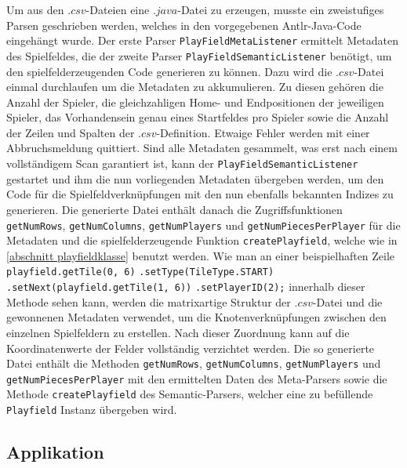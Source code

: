 \documentclass[conference]{IEEEtran}
\begin{document}
Um aus den $.csv$-Dateien eine $.java$-Datei zu erzeugen, musste ein zweistufiges Parsen geschrieben werden, welches in
den vorgegebenen Antlr-Java-Code eingeh\"angt wurde. Der erste Parser \texttt{PlayFieldMetaListener} ermittelt Metadaten des Spielfeldes, die der zweite Parser \texttt{PlayFieldSemanticListener} ben\"otigt, um den spielfelderzeugenden Code generieren zu k\"onnen. Dazu wird die $.csv$-Datei einmal durchlaufen um die Metadaten zu akkumulieren. Zu diesen geh\"oren die Anzahl der Spieler, die gleichzahligen Home- und Endpositionen der jeweiligen Spieler, das Vorhandensein genau eines Startfeldes pro Spieler sowie die Anzahl der Zeilen und Spalten der $.csv$-Definition. Etwaige Fehler werden mit einer Abbruchsmeldung quittiert. Sind alle Metadaten gesammelt, was erst nach einem vollst\"andigem Scan garantiert ist, kann der \texttt{PlayFieldSemanticListener} gestartet und ihm die nun vorliegenden Metadaten \"ubergeben werden, um den Code f\"ur die Spielfeldverkn\"upfungen mit den nun ebenfalls bekannten Indizes zu generieren.
Die generierte Datei enth\"alt danach die Zugriffsfunktionen 
\texttt{getNumRows},
\texttt{getNumColumns},
\texttt{getNumPlayers} und
\texttt{getNumPiecesPerPlayer}
f\"ur die Metadaten und die spielfelderzeugende Funktion \texttt{createPlayfield}, welche wie in \ref{abschnitt playfieldklasse} benutzt werden. Wie man an einer beispielhaften Zeile\newline
\texttt{playfield.getTile(0, 6)}\newline
\texttt{.setType(TileType.START)}\newline
\texttt{.setNext(playfield.getTile(1, 6))}\newline
\texttt{.setPlayerID(2);}\newline
 innerhalb dieser Methode sehen kann, werden die matrixartige Struktur der $.csv$-Datei und die gewonnenen Metadaten verwendet, um die Knotenverkn\"upfungen zwischen den einzelnen Spielfeldern zu erstellen. Nach dieser Zuordnung kann auf die Koordinatenwerte der Felder vollst\"andig verzichtet werden. Die so generierte Datei enth\"alt die Methoden \texttt{getNumRows}, \texttt{getNumColumns}, \texttt{getNumPlayers} und \texttt{getNumPiecesPerPlayer} mit den ermittelten Daten des Meta-Parsers
sowie die Methode \texttt{createPlayfield} des Semantic-Parsers, welcher eine zu bef\"ullende \texttt{Playfield} Instanz \"ubergeben wird.



\subsection{Applikation}
\end{document}
